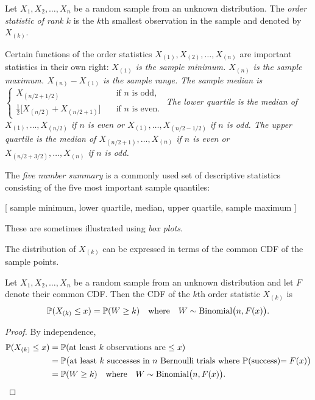 \begin{definition}
Let $X_1,X_2,\ldots,X_n$ be a random sample from an unknown distribution. The \emph{order statistic of rank $k$} is the $k$th smallest observation in the sample and denoted by $X_{(k)}$.
\end{definition}

Certain functions of the order statistics $X_{(1)},X_{(2)},\ldots,X_{(n)}$ are important statistics in their own right:
\bit
\it $X_{(1)}$ is the \emph{sample minimum}.
\it $X_{(n)}$ is the \emph{sample maximum}.
\it $X_{(n)} - X_{(1)}$ is the \emph{sample range}.
\it 
The \emph{sample median} is $\begin{cases} X_{(n/2+1/2)} & \quad\text{if $n$ is odd,} \\[2ex] \frac{1}{2}\big[X_{(n/2)}+X_{(n/2+1)}\big] & \quad\text{if $n$ is even.} \end{cases}$
\it
The \emph{lower quartile} is the median of $X_{(1)},\ldots,X_{(n/2)}$ if $n$ is even or $X_{(1)},\ldots,X_{(n/2-1/2)}$ if $n$ is odd.
\it
The \emph{upper quartile} is the median of $X_{(n/2+1)},\ldots,X_{(n)}$ if $n$ is even or $X_{(n/2+3/2)},\ldots,X_{(n)}$ if $n$ is odd.
\eit

\begin{remark}
The \emph{five number summary} is a commonly used set of descriptive statistics consisting of the five most important sample quantiles:
\begin{center}
[ sample minimum, lower quartile, median, upper quartile, sample maximum ]
\end{center}
These are sometimes illustrated using \emph{box plots}.
\end{remark}

The distribution of $X_{(k)}$ can be expressed in terms of the common CDF of the sample points.
\begin{theorem}
Let $X_1,X_2,\ldots,X_n$ be a random sample from an unknown distribution and let $F$ denote their common CDF. Then the CDF of the $k$th order statistic $X_{(k)}$ is 
\[
\mathbb{P}(X_{(k)}\leq x) = \mathbb{P}(W\geq k) \quad\text{where}\quad W\sim\text{Binomial}\big(n,F(x)\big). 
\]
\begin{proof}
By independence,
\begin{align*}
\mathbb{P}(X_{(k)}\leq x)
	& = \mathbb{P}(\text{at least $k$ observations are $\leq x$}) \\
	& = \mathbb{P}\big(\text{at least $k$ successes in $n$ Bernoulli trials where P(success)$=F(x)$}\big) \\
	& = \mathbb{P}(W\geq k) \quad\text{where}\quad W\sim\text{Binomial}\big(n,F(x)\big). 
\end{align*}
\end{proof}
\end{theorem}

